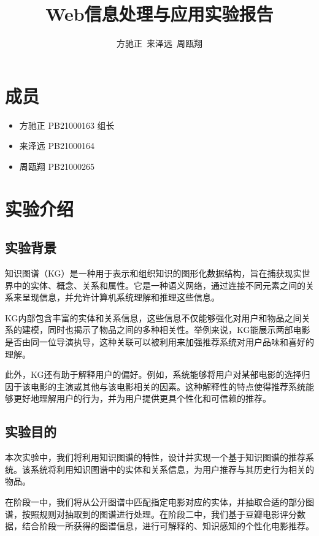 \documentclass{ctexart}
\title{\textbf{Web信息处理与应用实验报告}}
\author{方驰正\ 来泽远\ 周瓯翔}
\begin{document}
\begin{sloppypar}

\maketitle

\section{成员}

\begin{itemize}
      \item 方驰正 PB21000163 组长
      \item 来泽远 PB21000164
      \item 周瓯翔 PB21000265
\end{itemize}

\section{实验介绍}

\subsection{实验背景}
知识图谱（KG）是一种用于表示和组织知识的图形化数据结构，旨在捕获现实世界中的实体、概念、关系和属性。它是一种语义网络，通过连接不同元素之间的关系来呈现信息，并允许计算机系统理解和推理这些信息。

KG内部包含丰富的实体和关系信息，这些信息不仅能够强化对用户和物品之间关系的建模，同时也揭示了物品之间的多种相关性。举例来说，KG能展示两部电影是否由同一位导演执导，这种关联可以被利用来加强推荐系统对用户品味和喜好的理解。

此外，KG还有助于解释用户的偏好。例如，系统能够将用户对某部电影的选择归因于该电影的主演或其他与该电影相关的因素。这种解释性的特点使得推荐系统能够更好地理解用户的行为，并为用户提供更具个性化和可信赖的推荐。
\subsection{实验目的}
本次实验中，我们将利用知识图谱的特性，设计并实现一个基于知识图谱的推荐系统。该系统将利用知识图谱中的实体和关系信息，为用户推荐与其历史行为相关的物品。

在阶段一中，我们将从公开图谱中匹配指定电影对应的实体，并抽取合适的部分图谱，按照规则对抽取到的图谱进行处理。在阶段二中，我们基于豆瓣电影评分数据，结合阶段一所获得的图谱信息，进行可解释的、知识感知的个性化电影推荐。


\end{sloppypar}
\end{document}
